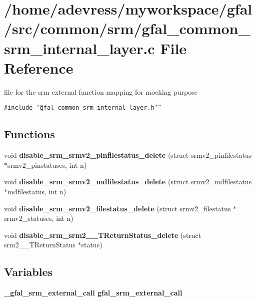 \section{/home/adevress/myworkspace/gfal/src/common/srm/gfal\_\-common\_\-srm\_\-internal\_\-layer.c File Reference}
\label{gfal__common__srm__internal__layer_8c}
file for the srm external function mapping for mocking purpose 

{\tt \#include \char`\"{}gfal\_\-common\_\-srm\_\-internal\_\-layer.h\char`\"{}}\par
\subsection*{Functions}
\begin{CompactItemize}
\item 
void \textbf{disable\_\-srm\_\-srmv2\_\-pinfilestatus\_\-delete} (struct srmv2\_\-pinfilestatus $\ast$srmv2\_\-pinstatuses, int n)\label{gfal__common__srm__internal__layer_8c_8e2cd5e00a1a2bd7e8d406f4ddf513b8}

\item 
void \textbf{disable\_\-srm\_\-srmv2\_\-mdfilestatus\_\-delete} (struct srmv2\_\-mdfilestatus $\ast$mdfilestatus, int n)\label{gfal__common__srm__internal__layer_8c_5409a0e92e9a9cf5fbc81175849af2e0}

\item 
void \textbf{disable\_\-srm\_\-srmv2\_\-filestatus\_\-delete} (struct srmv2\_\-filestatus $\ast$srmv2\_\-statuses, int n)\label{gfal__common__srm__internal__layer_8c_ac574c65ab7448db1b52793f0d0253ad}

\item 
void \textbf{disable\_\-srm\_\-srm2\_\-\_\-TReturn\-Status\_\-delete} (struct srm2\_\-\_\-TReturn\-Status $\ast$status)\label{gfal__common__srm__internal__layer_8c_a96c876905e63d4d3c90a7c8a986b2c9}

\end{CompactItemize}
\subsection*{Variables}
\begin{CompactItemize}
\item 
\bf{\_\-gfal\_\-srm\_\-external\_\-call} \textbf{gfal\_\-srm\_\-external\_\-call}
\end{CompactItemize}


